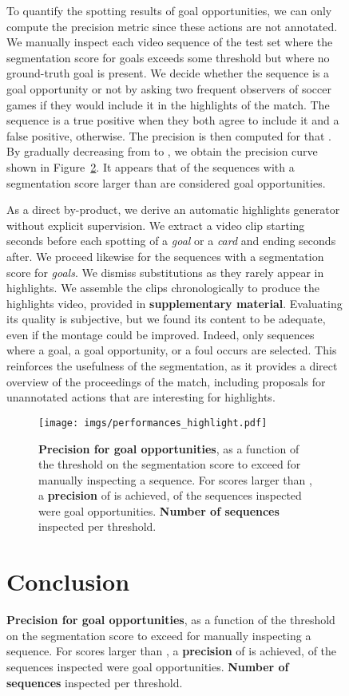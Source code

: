 \documentclass[10pt,twocolumn,letterpaper]{article}
\begin{document}
\begin{figure}[t]
{\begin{minipage}{\linewidth}
To quantify the spotting results of goal opportunities, we can only compute the precision metric since these actions are not annotated. We manually inspect each video sequence of the test set where the segmentation score for goals exceeds some threshold  but where no ground-truth goal is present. We decide whether the sequence is a goal opportunity or not by asking two frequent observers of soccer games if they would include it in the highlights of the match. The sequence is a true positive when they both agree to include it and a false positive, otherwise. The precision is then computed for that . By gradually decreasing  from  to , we obtain the precision curve shown in Figure~\ref{fig:PerformanceHighlight}. It appears that  of the sequences with a segmentation score larger than  are considered goal opportunities. 



As a direct by-product, we derive an automatic highlights generator without explicit supervision. We extract a video clip starting  seconds before each spotting of a \emph{goal} or a \emph{card} and ending  seconds after. We proceed likewise for the sequences with a segmentation score  for \emph{goals}. We dismiss substitutions as they rarely appear in highlights. We assemble the clips chronologically to produce the highlights video, provided in \textbf{supplementary material}. Evaluating its quality is subjective, but we found its content to be adequate, even if the montage could be improved. Indeed, only sequences where a goal, a goal opportunity, or a foul occurs are selected. This reinforces the usefulness of the segmentation,  as it provides a direct overview of the proceedings of the match, including proposals for unannotated actions that are interesting for highlights.


\begin{figure}
    \centering
    \texttt{[image: imgs/performances\_highlight.pdf]}
    \caption{\textbf{Precision for goal opportunities}, as a function of the threshold on the segmentation score to exceed for manually inspecting a sequence. For scores larger than , a {\color{anthoorange}\textbf{precision}} of  is achieved, \ie  of the sequences inspected were goal opportunities. {\color{anthoblue}\textbf{Number of sequences}} inspected per threshold.}
    \label{fig:PerformanceHighlight}
\end{figure} \section{Conclusion}
\label{sec:Conclusion}


\end{minipage}}
\end{figure}
\end{document}
